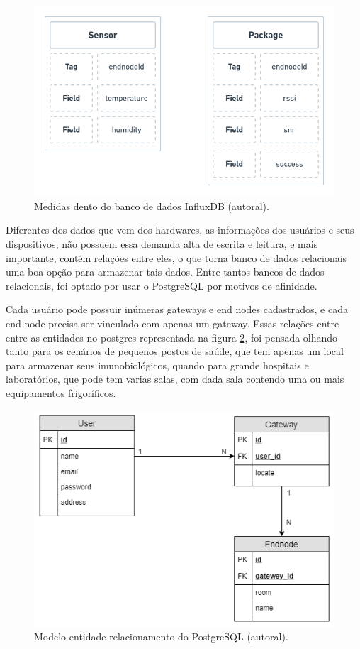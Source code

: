 \begin{figure}[H]
  \centering
  \includegraphics[width=.80\textwidth]{assets/influx-model.png} 
  \caption{Medidas dento do banco de dados InfluxDB (autoral).}
  \label{fig:influxdb-model} 
\end{figure}

Diferentes dos dados que vem dos hardwares, as informações dos usuários e seus dispositivos, não possuem essa demanda alta de escrita e leitura, e mais importante, contém relações entre eles, o que torna banco de dados relacionais uma boa opção para armazenar tais dados. Entre tantos bancos de dados relacionais, foi optado por usar o PostgreSQL por motivos de afinidade.

Cada usuário pode possuir inúmeras gateways e end nodes cadastrados, e cada end node precisa ser vinculado com apenas um gateway. Essas relações entre entre as entidades no postgres representada na figura \ref{fig:postgres-model}, foi pensada olhando tanto para os cenários de pequenos postos de saúde, que tem apenas um local para armazenar seus imunobiológicos, quando para grande hospitais e laboratórios, que pode tem varias salas, com dada sala contendo uma ou mais equipamentos frigoríficos.

\begin{figure}[H]
  \centering
  \includegraphics[width=.80\textwidth]{assets/postgres-model.png} 
  \caption{Modelo entidade relacionamento do PostgreSQL (autoral).}
  \label{fig:postgres-model} 
\end{figure}

